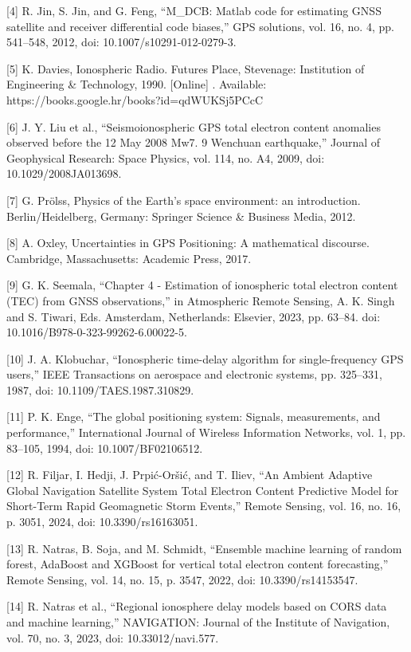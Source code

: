 \let\LaTeXcline\cline\documentclass[sn-mathphys-num]{sn-jnl}\let\cline\LaTeXcline
\begin{document}
[4] R. Jin, S. Jin, and G. Feng, “M_DCB: Matlab code for estimating GNSS satellite and receiver differential code biases,” GPS solutions, vol. 16, no. 4, pp. 541–548, 2012, doi: 10.1007/s10291-012-0279-3.

[5] K. Davies, Ionospheric Radio. Futures Place, Stevenage: Institution of Engineering & Technology, 1990. [Online] . Available: https://books.google.hr/books?id=qdWUKSj5PCcC

[6] J. Y. Liu et al., “Seismoionospheric GPS total electron content anomalies observed before the 12 May 2008 Mw7. 9 Wenchuan earthquake,” Journal of Geophysical Research: Space Physics, vol. 114, no. A4, 2009, doi: 10.1029/2008JA013698.

[7] G. Prölss, Physics of the Earth’s space environment: an introduction. Berlin/Heidelberg, Germany: Springer Science & Business Media, 2012.

[8] A. Oxley, Uncertainties in GPS Positioning: A mathematical discourse. Cambridge, Massachusetts: Academic Press, 2017.

[9] G. K. Seemala, “Chapter 4 - Estimation of ionospheric total electron content (TEC) from GNSS observations,” in Atmospheric Remote Sensing, A. K. Singh and S. Tiwari, Eds. Amsterdam, Netherlands: Elsevier, 2023, pp. 63–84. doi: 10.1016/B978-0-323-99262-6.00022-5.

[10] J. A. Klobuchar, “Ionospheric time-delay algorithm for single-frequency GPS users,” IEEE Transactions on aerospace and electronic systems, pp. 325–331, 1987, doi: 10.1109/TAES.1987.310829.

[11] P. K. Enge, “The global positioning system: Signals, measurements, and performance,” International Journal of Wireless Information Networks, vol. 1, pp. 83–105, 1994, doi: 10.1007/BF02106512.

[12] R. Filjar, I. Hedji, J. Prpić-Oršić, and T. Iliev, “An Ambient Adaptive Global Navigation Satellite System Total Electron Content Predictive Model for Short-Term Rapid Geomagnetic Storm Events,” Remote Sensing, vol. 16, no. 16, p. 3051, 2024, doi: 10.3390/rs16163051.

[13] R. Natras, B. Soja, and M. Schmidt, “Ensemble machine learning of random forest, AdaBoost and XGBoost for vertical total electron content forecasting,” Remote Sensing, vol. 14, no. 15, p. 3547, 2022, doi: 10.3390/rs14153547.

[14] R. Natras et al., “Regional ionosphere delay models based on CORS data and machine learning,” NAVIGATION: Journal of the Institute of Navigation, vol. 70, no. 3, 2023, doi: 10.33012/navi.577.
\end{document}
